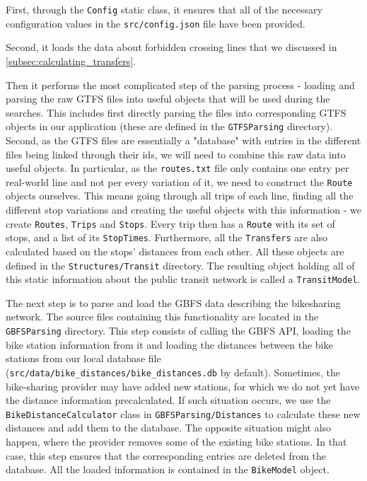 \vspace{10pt}

First, through the \texttt{Config} static class, it ensures that all of the necessary configuration values in the \texttt{src/config.json} file have been provided.

\vspace{10pt}

Second, it loads the data about forbidden crossing lines that we discussed in \cref{subsec:calculating_transfers}.

\vspace{10pt}

Then it performs the most complicated step of the parsing process - loading and parsing the raw GTFS files into useful objects that will be used during the searches. This includes first directly parsing the files into corresponding GTFS objects in our application (these are defined in the \texttt{GTFSParsing} directory). Second, as the GTFS files are essentially a "database" with entries in the different files being linked through their ids, we will need to combine this raw data into useful objects. In particular, as the \texttt{routes.txt} file only contains one entry per real-world line and not per every variation of it, we need to construct the \texttt{Route} objects ourselves. This means going through all trips of each line, finding all the different stop variations and creating the useful objects with this information - we create \texttt{Routes}, \texttt{Trips} and \texttt{Stops}. Every trip then has a \texttt{Route} with its set of stops, and a list of its \texttt{StopTimes}. Furthermore, all the \texttt{Transfers} are also calculated based on the stops' distances from each other. All these objects are defined in the \texttt{Structures/Transit} directory. The resulting object holding all of this static information about the public transit network is called a \texttt{TransitModel}.

\vspace{10pt}

The next step is to parse and load the GBFS data describing the bikesharing network. The source files containing this functionality are located in the \texttt{GBFSParsing} directory. This step consists of calling the GBFS API, loading the bike station information from it and loading the distances between the bike stations from our local database file (\texttt{src/data/bike\_distances/bike\_distances.db} by default). Sometimes, the bike-sharing provider may have added new stations, for which we do not yet have the distance information precalculated. If such situation occurs, we use the \texttt{BikeDistanceCalculator} class in \texttt{GBFSParsing/Distances} to calculate these new distances and add them to the database. The opposite situation might also happen, where the provider removes some of the existing bike stations. In that case, this step ensures that the corresponding entries are deleted from the database. All the loaded information is contained in the \texttt{BikeModel} object.

